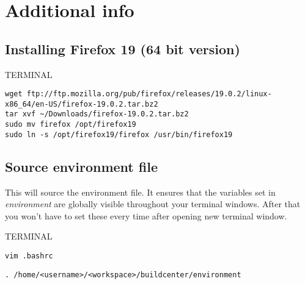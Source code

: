 \documentclass[10pt,a4paper]{article}
\begin{document}
\newpage
\section{Additional info}
\subsection{Installing Firefox 19 (64 bit version)}

\begin{command}{TERMINAL}
\begin{lstlisting}
wget ftp://ftp.mozilla.org/pub/firefox/releases/19.0.2/linux-x86_64/en-US/firefox-19.0.2.tar.bz2
tar xvf ~/Downloads/firefox-19.0.2.tar.bz2 
sudo mv firefox /opt/firefox19
sudo ln -s /opt/firefox19/firefox /usr/bin/firefox19
\end{lstlisting}
\end{command}

\subsection{Source environment file}\label{sec:sourcing}

This will source the environment file. It ensures that the variables set in \textit{environment} are globally visible throughout your terminal windows. After that you won't have to set these every time after opening new terminal window.

\begin{command}{TERMINAL}

\noindent
{}

\begin{lstlisting}
vim .bashrc
\end{lstlisting}

\noindent
{}

\begin{lstlisting}
. /home/<username>/<workspace>/buildcenter/environment
\end{lstlisting}

\noindent
{}

\end{command}
\end{document}
